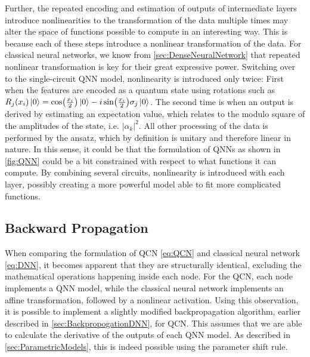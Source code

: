 Further, the repeated encoding and estimation of outputs of intermediate layers introduce nonlinearities to the transformation of the data multiple times may alter the space of functions possible to compute in an interesting way. This is because each of these steps introduce a nonlinear transformation of the data. For classical neural networks, we know from \autoref{sec:DenseNeuralNetwork} that repeated nonlinear transformation is key for their great expressive power. Switching over to the single-circuit QNN model, nonlinearity is introduced only twice: First when the features are encoded as a quantum state using rotations such as $R_j(x_i)\ket{0} = \cos(\frac{x_i}{2})\ket{0} - i\sin(\frac{x_i}{2})\sigma_j\ket{0}$. The second time is when an output is derived by estimating an expectation value, which relates to the modulo square of the amplitudes of the state, i.e. $|\alpha_k|^2$. All other processing of the data is performed by the ansatz, which by definition is unitary and therefore linear in nature. In this sense, it could be that the formulation of QNNs as shown in \autoref{fig:QNN} could be a bit constrained with respect to what functions it can compute. By combining several circuits, nonlinearity is introduced with each layer, possibly creating a more powerful model able to fit more complicated functions.  



\subsection{Backward Propagation}\label{sec:BackwardPropagationQCN}
When comparing the formulation of QCN \autoref{eq:QCN} and classical neural network \autoref{eq:DNN}, it becomes apparent that they are structurally identical, excluding the mathematical operations happening inside each node. For the QCN, each node implements a QNN model, while the classical neural network implements an affine transformation, followed by a nonlinear activation. Using this observation, it is possible to implement a slightly modified backpropagation algorithm, earlier described in \autoref{sec:BackpropogationDNN}, for QCN. This assumes that we are able to calculate the derivative of the outputs of each QNN model. As described in \autoref{sec:ParametricModels}, this is indeed possible using the parameter shift rule. 

